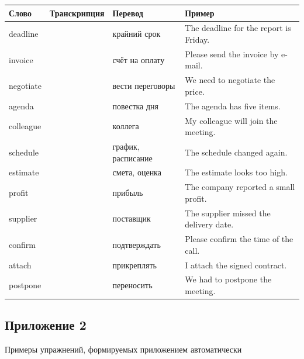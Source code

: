 \documentclass[11pt,a4paper,openany]{report}
\newcommand{\ipa}[1]{\foreignlanguage{english}{{\ipafont #1}}}
\begin{document}
\begin{center}
\small
\begin{tabular}{|p{2.6cm}|p{2.9cm}|p{3.0cm}|p{7.6cm}|}
\hline
Слово & Транскрипция & Перевод & Пример \\
\hline
deadline & {\ipa [ˈdedlaɪn]} & крайний срок & The deadline for the report is Friday. \\
\hline
invoice & {\ipa [ˈɪnvɔɪs]} & счёт на оплату & Please send the invoice by e-mail. \\
\hline
negotiate & {\ipa [nɪˈɡəʊʃieɪt]} & вести переговоры & We need to negotiate the price. \\
\hline
agenda & {\ipa [əˈdʒendə]} & повестка дня & The agenda has five items. \\
\hline
colleague & {\ipa [ˈkɒliːɡ]} & коллега & My colleague will join the meeting. \\
\hline
schedule & {\ipa [ˈʃedjuːl]} & график, расписание & The schedule changed again. \\
\hline
estimate & {\ipa [ˈestɪmət]} & смета, оценка & The estimate looks too high. \\
\hline
profit & {\ipa [ˈprɒfɪt]} & прибыль & The company reported a small profit. \\
\hline
supplier & {\ipa [səˈplaɪə]} & поставщик & The supplier missed the delivery date. \\
\hline
confirm & {\ipa [kənˈfɜːm]} & подтверждать & Please confirm the time of the call. \\
\hline
attach & {\ipa [əˈtætʃ]} & прикреплять & I attach the signed contract. \\
\hline
postpone & {\ipa [pəˈspəʊn]} & переносить & We had to postpone the meeting. \\
\hline
\end{tabular}
\end{center}

\subsection*{Приложение 2}

Примеры упражнений, формируемых приложением автоматически
\end{document}
